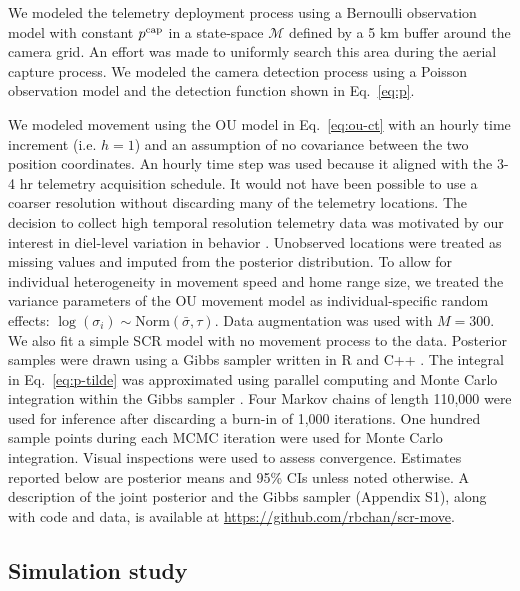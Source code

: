 \documentclass[12pt]{article}
\begin{document}
We modeled the telemetry deployment process using a Bernoulli
observation model with constant $p^{\rm cap}$ in a state-space
$\mathcal M$ defined by a 5 km buffer around the camera grid.
An effort was made to uniformly search this area during the aerial
capture process. We modeled the camera detection process using a
Poisson observation model and the detection function shown in Eq.~\ref{eq:p}. 

We modeled movement using the OU model in Eq.~\ref{eq:ou-ct} with an
hourly time increment (i.e. $h=1$) and an assumption of no covariance
between the two position coordinates. An hourly time step was used
because it aligned with the 3-4 hr telemetry acquisition schedule. It
would not have been possible to use a coarser resolution without
discarding many of the telemetry locations.
The decision to collect high temporal resolution telemetry data was
motivated by our interest in diel-level variation in behavior
\citep{crawford_etal:2019}. Unobserved locations were treated as
missing values and imputed from the posterior distribution.
To allow for individual heterogeneity in
movement speed and home range size, we treated the variance parameters
of the OU movement model as individual-specific random effects:
$\log(\sigma_i) \sim \mathrm{Norm}(\bar{\sigma}, \tau)$. Data
augmentation was used with $M=300$. 
We also fit a simple SCR model with no movement process to the data. 
Posterior samples were drawn using a Gibbs sampler written in R and C++ 
\citep{eddelbuettel_sanderson:2014,R:2021}. 
The integral in Eq.~\ref{eq:p-tilde} was approximated using parallel
computing and Monte Carlo integration within the Gibbs
sampler \citep{bonner_schofield:2014}.
Four Markov chains of length 110,000 were used for inference after
discarding a burn-in of 1,000 iterations. One hundred sample points
during each MCMC iteration were used for Monte Carlo
integration. Visual inspections were used to assess
convergence. Estimates reported below are posterior means and 95\% CIs
unless noted otherwise. A description of the joint posterior and the
Gibbs sampler (Appendix S1), along with code and data, is available at
\url{https://github.com/rbchan/scr-move}.  

\subsection{Simulation study}
\end{document}
